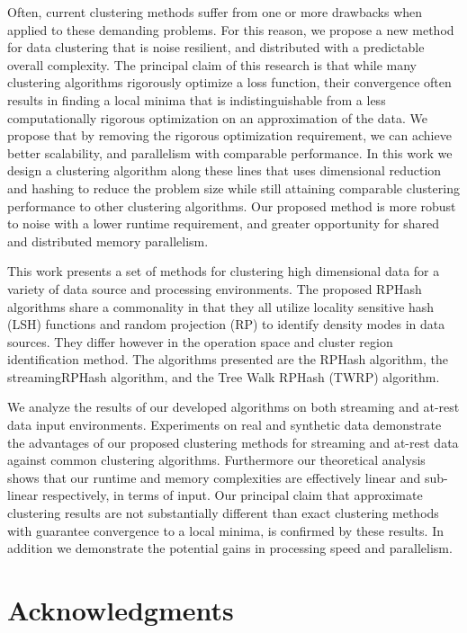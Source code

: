 Often, current clustering methods suffer from one or more drawbacks when applied to these demanding problems.  For
this reason, we propose a new method for data clustering that is noise resilient, and distributed with a predictable
overall complexity.  The principal claim of this research is that while many clustering algorithms rigorously optimize
a loss function, their convergence often results in finding a local minima that is indistinguishable from a less 
computationally rigorous optimization on an approximation of the data.  We propose that by removing the rigorous optimization 
requirement, we can achieve better scalability, and parallelism with comparable performance.  In this work we design a 
clustering algorithm along these lines that uses dimensional reduction and hashing to reduce the problem size while still 
attaining comparable clustering performance to other clustering algorithms. Our proposed method is more robust to 
noise with a lower runtime requirement, and greater opportunity for shared and distributed memory parallelism.

This work presents a set of methods for clustering high dimensional data for a variety of data source and processing
environments. The proposed \textsf{RPHash} algorithms share a commonality in that they all utilize locality sensitive hash (LSH)
functions and random projection (RP) to identify density modes in data sources.  They differ however in the operation space
and cluster region identification method. The algorithms presented are the \textsf{RPHash} algorithm, the 
\textsf{streamingRPHash} algorithm, and the Tree Walk RPHash (\textsf{TWRP}) algorithm.

We analyze the results of our developed algorithms on both streaming and at-rest data input environments.
Experiments on real and synthetic data demonstrate the advantages of our proposed clustering methods for 
streaming and at-rest data against common clustering algorithms.  Furthermore our theoretical analysis shows
that our runtime and memory complexities are effectively linear and sub-linear respectively, in terms of input.
Our principal claim that approximate clustering results are not substantially different than exact 
clustering methods with guarantee convergence to a local minima, is confirmed by these results. In addition
we demonstrate the potential gains in processing speed and parallelism.


\chapter*{Acknowledgments} 

